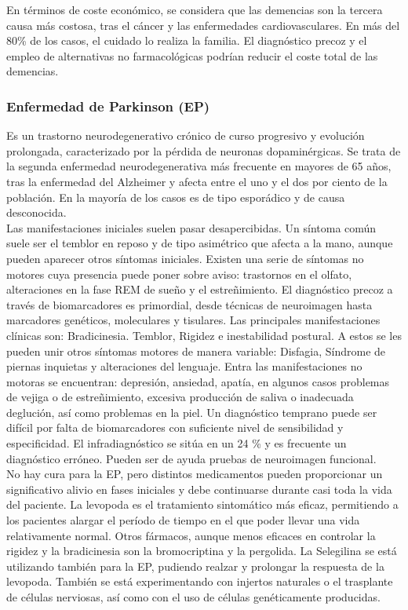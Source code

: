 \documentclass[12pt]{article}
\begin{document}
		En términos de coste económico, se considera que las demencias son la tercera causa más costosa, tras el cáncer y las enfermedades cardiovasculares. En más del 80\% de los casos, el cuidado lo realiza la familia. El diagnóstico precoz y el empleo de alternativas no farmacológicas podrían reducir el coste total de las demencias.		
		
		\subsubsection{Enfermedad de Parkinson (EP)}
		
		Es un trastorno neurodegenerativo crónico de curso progresivo y evolución prolongada, caracterizado por la pérdida de neuronas dopaminérgicas. Se trata de la segunda enfermedad neurodegenerativa más frecuente en mayores de 65 años, tras la enfermedad del Alzheimer y afecta entre el uno y el dos por ciento de la población. En la mayoría de los casos es de tipo esporádico y de causa desconocida.\\
		
		Las manifestaciones iniciales suelen pasar desapercibidas. Un síntoma común suele ser el temblor en reposo y de tipo asimétrico que afecta a la mano, aunque pueden aparecer otros síntomas iniciales. Existen una serie de síntomas no motores cuya presencia puede poner sobre aviso: trastornos en el olfato, alteraciones en la fase REM de sueño y el estreñimiento. El diagnóstico precoz a través de biomarcadores es primordial, desde técnicas de neuroimagen hasta marcadores genéticos, moleculares y tisulares. Las principales manifestaciones clínicas son: Bradicinesia. Temblor, Rigidez e inestabilidad postural. A estos se les pueden unir otros síntomas motores de manera variable: Disfagia, Síndrome de piernas inquietas y alteraciones del lenguaje. Entra las manifestaciones no motoras se encuentran: depresión, ansiedad, apatía,  en algunos casos problemas de vejiga o de estreñimiento, excesiva producción de saliva o inadecuada deglución, así como problemas en la piel. Un diagnóstico temprano puede ser difícil por falta de biomarcadores con suficiente nivel de sensibilidad y especificidad. El infradiagnóstico se sitúa en un 24 \% y es frecuente un diagnóstico erróneo. Pueden ser de ayuda pruebas de neuroimagen funcional.\\
		
		No hay cura para la EP, pero distintos medicamentos pueden proporcionar un significativo alivio en fases iniciales y debe continuarse durante casi toda la vida del paciente. La levopoda es el tratamiento sintomático más eficaz, permitiendo a los pacientes alargar el período de tiempo en el que poder llevar una vida relativamente normal. Otros fármacos, aunque menos eficaces en controlar la rigidez y la bradicinesia son la bromocriptina y la pergolida. La Selegilina se está utilizando también para la EP, pudiendo realzar y prolongar la respuesta de la levopoda. También se está experimentando con injertos naturales o el trasplante de células nerviosas, así como con el uso de células genéticamente producidas.\\
		
\end{document}
